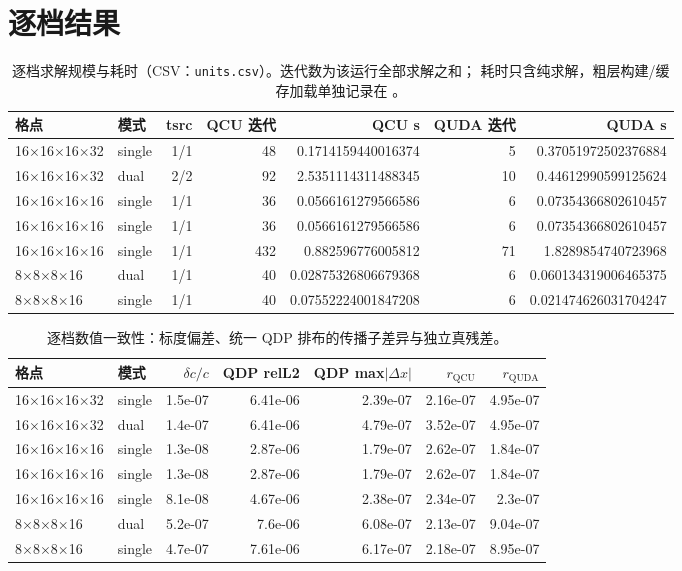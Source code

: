 \documentclass[UTF8,a4paper,11pt]{ctexart}
\newcommand{\code}[1]{\texttt{\detokenize{#1}}}
\begin{document}
\section{逐档结果}
\label{sec:results}
\begin{table}[htbp]\centering\small
\caption{逐档求解规模与耗时（CSV：\texttt{units.csv}）。迭代数为该运行全部求解之和；
耗时只含纯求解，粗层构建/缓存加载单独记录在 \code{record.json}。}
\begin{tabular}{@{}llrrrrr@{}}
\toprule
格点 & 模式 & tsrc & QCU 迭代 & QCU s & QUDA 迭代 & QUDA s \\
\midrule
16$\times$16$\times$16$\times$32 & single & 1/1 & 48 & 0.1714159440016374 & 5 & 0.37051972502376884 \\
16$\times$16$\times$16$\times$32 & dual & 2/2 & 92 & 2.5351114311488345 & 10 & 0.44612990599125624 \\
16$\times$16$\times$16$\times$16 & single & 1/1 & 36 & 0.0566161279566586 & 6 & 0.07354366802610457 \\
16$\times$16$\times$16$\times$16 & single & 1/1 & 36 & 0.0566161279566586 & 6 & 0.07354366802610457 \\
16$\times$16$\times$16$\times$16 & single & 1/1 & 432 & 0.882596776005812 & 71 & 1.8289854740723968 \\
8$\times$8$\times$8$\times$16 & dual & 1/1 & 40 & 0.02875326806679368 & 6 & 0.060134319006465375 \\
8$\times$8$\times$8$\times$16 & single & 1/1 & 40 & 0.07552224001847208 & 6 & 0.021474626031704247 \\
\bottomrule
\end{tabular}
\end{table}

\begin{table}[htbp]\centering\small
\caption{逐档数值一致性：标度偏差、统一 QDP 排布的传播子差异与独立真残差。}
\begin{tabular}{@{}llrrrrr@{}}
\toprule
格点 & 模式 & $\delta c/c$ & QDP relL2 & QDP max$|\Delta x|$ & $r_{\mathrm{QCU}}$ & $r_{\mathrm{QUDA}}$ \\
\midrule
16$\times$16$\times$16$\times$32 & single & 1.5e-07 & 6.41e-06 & 2.39e-07 & 2.16e-07 & 4.95e-07 \\
16$\times$16$\times$16$\times$32 & dual & 1.4e-07 & 6.41e-06 & 4.79e-07 & 3.52e-07 & 4.95e-07 \\
16$\times$16$\times$16$\times$16 & single & 1.3e-08 & 2.87e-06 & 1.79e-07 & 2.62e-07 & 1.84e-07 \\
16$\times$16$\times$16$\times$16 & single & 1.3e-08 & 2.87e-06 & 1.79e-07 & 2.62e-07 & 1.84e-07 \\
16$\times$16$\times$16$\times$16 & single & 8.1e-08 & 4.67e-06 & 2.38e-07 & 2.34e-07 & 2.3e-07 \\
8$\times$8$\times$8$\times$16 & dual & 5.2e-07 & 7.6e-06 & 6.08e-07 & 2.13e-07 & 9.04e-07 \\
8$\times$8$\times$8$\times$16 & single & 4.7e-07 & 7.61e-06 & 6.17e-07 & 2.18e-07 & 8.95e-07 \\
\bottomrule
\end{tabular}
\end{table}
\end{document}
